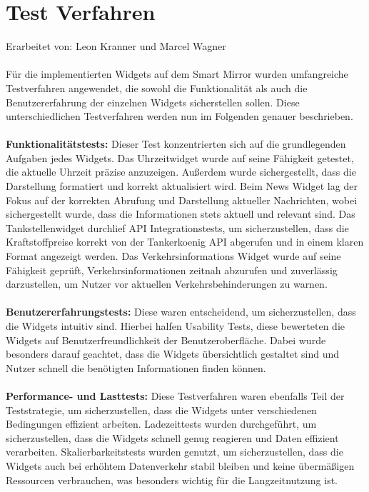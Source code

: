 \section{Test Verfahren}
Erarbeitet von: Leon Kranner und Marcel Wagner \\ \\
\noindent
Für die implementierten Widgets auf dem Smart Mirror wurden umfangreiche Testverfahren angewendet, die sowohl die Funktionalität als auch die Benutzererfahrung der einzelnen Widgets sicherstellen sollen. Diese unterschiedlichen Testverfahren werden nun im Folgenden genauer beschrieben. \\ \\
\noindent
\textbf{Funktionalitätstests:} Dieser Test konzentrierten sich auf die grundlegenden Aufgaben jedes Widgets. Das Uhrzeitwidget wurde auf seine Fähigkeit getestet, die aktuelle Uhrzeit präzise anzuzeigen. Außerdem wurde sichergestellt, dass die Darstellung formatiert und korrekt aktualisiert wird. Beim News Widget lag der Fokus auf der korrekten Abrufung und Darstellung aktueller Nachrichten, wobei sichergestellt wurde, dass die Informationen stets aktuell und relevant sind. Das Tankstellenwidget durchlief API Integrationstests, um sicherzustellen, dass die Kraftstoffpreise korrekt von der Tankerkoenig API abgerufen und in einem klaren Format angezeigt werden. Das Verkehrsinformations Widget wurde auf seine Fähigkeit geprüft, Verkehrsinformationen zeitnah abzurufen und zuverlässig darzustellen, um Nutzer vor aktuellen Verkehrsbehinderungen zu warnen. \\ \\
\noindent
\textbf{Benutzererfahrungstests:} Diese waren entscheidend, um sicherzustellen, dass die Widgets intuitiv sind. Hierbei halfen Usability Tests, diese bewerteten die Widgets auf Benutzerfreundlichkeit der Benutzeroberfläche. Dabei wurde besonders darauf geachtet, dass die Widgets übersichtlich gestaltet sind und Nutzer schnell die benötigten Informationen finden können. \\ \\
\noindent
\textbf{Performance- und Lasttests:} Diese Testverfahren waren ebenfalls Teil der Teststrategie, um sicherzustellen, dass die Widgets unter verschiedenen Bedingungen effizient arbeiten. Ladezeittests wurden durchgeführt, um sicherzustellen, dass die Widgets schnell genug reagieren und Daten effizient verarbeiten. Skalierbarkeitstests wurden genutzt, um sicherzustellen, dass die Widgets auch bei erhöhtem Datenverkehr stabil bleiben und keine übermäßigen Ressourcen verbrauchen, was besonders wichtig für die Langzeitnutzung ist. \\ \\
